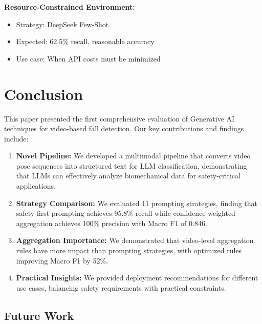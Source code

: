 \documentclass[conference]{IEEEtran}
\begin{document}
\textbf{Resource-Constrained Environment:}
\begin{itemize}[leftmargin=*]
    \item Strategy: DeepSeek Few-Shot
    \item Expected: 62.5\% recall, reasonable accuracy
    \item Use case: When API costs must be minimized
\end{itemize}

\section{Conclusion}

This paper presented the first comprehensive evaluation of Generative AI techniques for video-based fall detection. Our key contributions and findings include:

\begin{enumerate}[leftmargin=*]
    \item \textbf{Novel Pipeline:} We developed a multimodal pipeline that converts video pose sequences into structured text for LLM classification, demonstrating that LLMs can effectively analyze biomechanical data for safety-critical applications.
    
    \item \textbf{Strategy Comparison:} We evaluated 11 prompting strategies, finding that safety-first prompting achieves 95.8\% recall while confidence-weighted aggregation achieves 100\% precision with Macro F1 of 0.846.
    
    \item \textbf{Aggregation Importance:} We demonstrated that video-level aggregation rules have more impact than prompting strategies, with optimized rules improving Macro F1 by 52\%.
    
    \item \textbf{Practical Insights:} We provided deployment recommendations for different use cases, balancing safety requirements with practical constraints.
\end{enumerate}

\subsection{Future Work}
\end{document}
